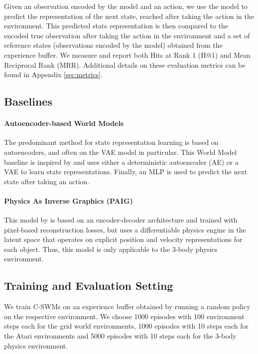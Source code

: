 \documentclass{article} %
\begin{document}
Given an observation encoded by the model and an action, we use the model to predict the representation of the next state, reached after taking the action in the environment. This predicted state representation is then compared to the encoded true observation after taking the action in the environment and a set of reference states (observations encoded by the model) obtained from the experience buffer. We measure and report both Hits at Rank 1 (H@1) and Mean Reciprocal Rank (MRR). Additional details on these evaluation metrics can be found in Appendix \ref{sec:metrics}.

\subsection{Baselines}
\paragraph{Autoencoder-based World Models} The predominant method for state representation learning is based on autoencoders, and often on the VAE \citep{kingma2013auto,rezende2014stochastic} model in particular. This World Model baseline is inspired by \citet{ha2018world} and uses either a deterministic autoencoder (AE) or a VAE to learn state representations. Finally, an MLP is used to predict the next state after taking an action.

\paragraph{Physics As Inverse Graphics (PAIG)} This model by \citet{jaques2019physics} is based on an encoder-decoder architecture and trained with pixel-based reconstruction losses, but uses a differentiable physics engine in the latent space that operates on explicit position and velocity representations for each object. Thus, this model is only applicable to the 3-body physics environment.

\subsection{Training and Evaluation Setting}
We train C-SWMs on an experience buffer obtained by running a random policy on the respective environment. We choose 1000 episodes with 100 environment steps each for the grid world environments, 1000 episodes with 10 steps each for the Atari environments and 5000 episodes with 10 steps each for the 3-body physics environment.
\end{document}
